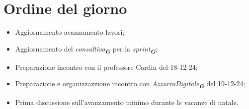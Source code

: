

\section{Ordine del giorno}

\begin{itemize}
    \item Aggiornamento avanzamento lavori;
    \item Aggiornamento del \emph{consultivo}\textsubscript{\textit{\textbf{G}}} per la \emph{sprint}\textsubscript{\textit{\textbf{G}}};
    \item Preparazione incontro con il professore Cardin del 18-12-24;
    \item Preparazione e organizzazzione incontro con \emph{AzzurroDigitale}\textsubscript{\textit{\textbf{G}}} del 19-12-24;
    \item Prima discussione sull'avanzamento minimo durante le vacanze di natale.
\end{itemize}
